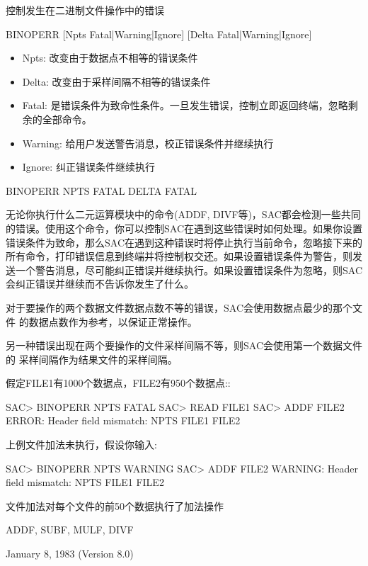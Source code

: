 \label{cmd:binoperr}

控制发生在二进制文件操作中的错误

BINOPERR [Npts Fatal|Warning|Ignore] [Delta Fatal|Warning|Ignore]

\begin{itemize}
\item Npts: 改变由于数据点不相等的错误条件 
\item Delta: 改变由于采样间隔不相等的错误条件 
\item Fatal: 是错误条件为致命性条件。一旦发生错误，控制立即返回终端，忽略剩余的全部命令。
\item Warning: 给用户发送警告消息，校正错误条件并继续执行
\item Ignore: 纠正错误条件继续执行
\end{itemize}

BINOPERR NPTS FATAL DELTA FATAL

无论你执行什么二元运算模块中的命令(ADDF, DIVF等)，SAC都会检测一些共同的错误。使用这个命令，你可以控制SAC在遇到这些错误时如何处理。如果你设置错误条件为致命，那么SAC在遇到这种错误时将停止执行当前命令，忽略接下来的所有命令，打印错误信息到终端并将控制权交还。如果设置错误条件为警告，则发送一个警告消息，尽可能纠正错误并继续执行。如果设置错误条件为忽略，则SAC会纠正错误并继续而不告诉你发生了什么。

对于要操作的两个数据文件数据点数不等的错误，SAC会使用数据点最少的那个文件	的数据点数作为参考，以保证正常操作。

另一种错误出现在两个要操作的文件采样间隔不等，则SAC会使用第一个数据文件的	采样间隔作为结果文件的采样间隔。

假定FILE1有1000个数据点，FILE2有950个数据点::
\begin{SACCode}
SAC> BINOPERR NPTS FATAL
SAC> READ FILE1
SAC> ADDF FILE2
ERROR:  Header field mismatch: NPTS FILE1 FILE2
\end{SACCode}
上例文件加法未执行，假设你输入:
\begin{SACCode}
SAC> BINOPERR NPTS WARNING
SAC> ADDF FILE2
WARNING:  Header field mismatch: NPTS FILE1 FILE2
\end{SACCode}
文件加法对每个文件的前50个数据执行了加法操作

ADDF, SUBF, MULF, DIVF

January 8, 1983 (Version 8.0)
